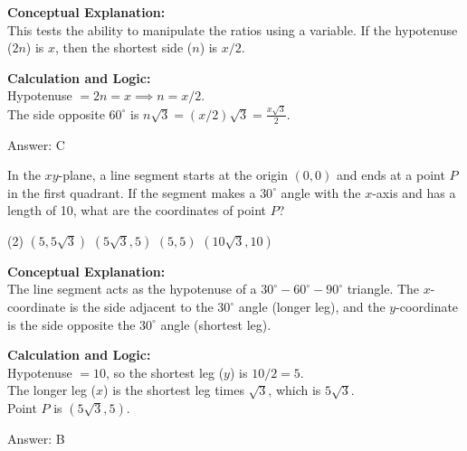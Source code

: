 \documentclass[11pt,paper=a4,answers]{exam}
\begin{document}
\begin{questions}
\begin{solution}
\textbf{Conceptual Explanation:} \\
This tests the ability to manipulate the ratios using a variable. If the hypotenuse ($2n$) is $x$, then the shortest side ($n$) is $x/2$.

\vspace{10pt}
\textbf{Calculation and Logic:} \\
Hypotenuse $= 2n = x \implies n = x/2$. \\
The side opposite $60^\circ$ is $n\sqrt{3} = (x/2)\sqrt{3} = \frac{x\sqrt{3}}{2}$.

\vspace{15pt}
Answer: \colorbox{yellow!100}{C}
\end{solution}


\question
In the $xy$-plane, a line segment starts at the origin $(0,0)$ and ends at a point $P$ in the first quadrant. If the segment makes a $30^\circ$ angle with the $x$-axis and has a length of 10, what are the coordinates of point $P$?
\begin{tasks}(2)
    \task $(5, 5\sqrt{3})$
    \task $(5\sqrt{3}, 5)$
    \task $(5, 5)$
    \task $(10\sqrt{3}, 10)$
\end{tasks}

\begin{solution}
\textbf{Conceptual Explanation:} \\
The line segment acts as the hypotenuse of a $30^\circ-60^\circ-90^\circ$ triangle. The $x$-coordinate is the side adjacent to the $30^\circ$ angle (longer leg), and the $y$-coordinate is the side opposite the $30^\circ$ angle (shortest leg).

\vspace{10pt}
\textbf{Calculation and Logic:} \\
Hypotenuse $= 10$, so the shortest leg ($y$) is $10/2 = 5$. \\
The longer leg ($x$) is the shortest leg times $\sqrt{3}$, which is $5\sqrt{3}$. \\
Point $P$ is $(5\sqrt{3}, 5)$.

\vspace{15pt}
Answer: \colorbox{yellow!100}{B}
\end{solution}


\end{questions}
\end{document}
